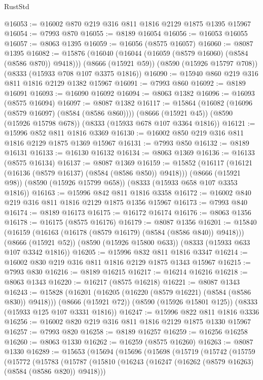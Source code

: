 \begin{lexlean}{RustStd}
\begin{coremodule}
@16053 := @16002 @870 @219 @316 @811 @1816 @2129 @1875 @1395 @15967
@16054 := @7993 @870
@16055 := @8189 @16054
@16056 := @16053 @16055
@16057 := @8063 @1395
@16059 := @16056 (@8575 @16057)
@16060 := @8087 @1395
@16082 := @15876
    (@16040 (@16044 (@16059 (@8579 @16060) (@8584 (@8586 @870)) @9418)))
    (@8666 (@15921 @59))
    (@8590 (@15926 @15797 @708))
    (@8333 (@15933 @708 @107 @3375 @1816))
@16090 := @15940 @860 @219 @316 @811 @1816 @2129 @1382 @15967
@16091 := @7993 @860
@16092 := @8189 @16091
@16093 := @16090 @16092
@16094 := @8063 @1382
@16096 := @16093 (@8575 @16094)
@16097 := @8087 @1382
@16117 := @15864
    (@16082 (@16096 (@8579 @16097) (@8584 (@8586 @860))))
    (@8666 (@15921 @45))
    (@8590 (@15926 @15798 @678))
    (@8333 (@15933 @678 @107 @3364 @1816))
@16121 := @15996 @852 @811 @1816 @3369
@16130 := @16002 @850 @219 @316 @811 @1816 @2129 @1875 @1369 @15967
@16131 := @7993 @850
@16132 := @8189 @16131
@16133 := @16130 @16132
@16134 := @8063 @1369
@16136 := @16133 (@8575 @16134)
@16137 := @8087 @1369
@16159 := @15852
    (@16117 (@16121 (@16136 (@8579 @16137) (@8584 (@8586 @850)) @9418)))
    (@8666 (@15921 @98))
    (@8590 (@15926 @15799 @658))
    (@8333 (@15933 @658 @107 @3353 @1816))
@16163 := @15996 @842 @811 @1816 @3358
@16172 := @16002 @840 @219 @316 @811 @1816 @2129 @1875 @1356 @15967
@16173 := @7993 @840
@16174 := @8189 @16173
@16175 := @16172 @16174
@16176 := @8063 @1356
@16178 := @16175 (@8575 @16176)
@16179 := @8087 @1356
@16201 := @15840
    (@16159 (@16163 (@16178 (@8579 @16179) (@8584 (@8586 @840)) @9418)))
    (@8666 (@15921 @52))
    (@8590 (@15926 @15800 @633))
    (@8333 (@15933 @633 @107 @3342 @1816))
@16205 := @15996 @832 @811 @1816 @3347
@16214 := @16002 @830 @219 @316 @811 @1816 @2129 @1875 @1343 @15967
@16215 := @7993 @830
@16216 := @8189 @16215
@16217 := @16214 @16216
@16218 := @8063 @1343
@16220 := @16217 (@8575 @16218)
@16221 := @8087 @1343
@16243 := @15828
    (@16201 (@16205 (@16220 (@8579 @16221) (@8584 (@8586 @830)) @9418)))
    (@8666 (@15921 @72))
    (@8590 (@15926 @15801 @125))
    (@8333 (@15933 @125 @107 @3331 @1816))
@16247 := @15996 @822 @811 @1816 @3336
@16256 := @16002 @820 @219 @316 @811 @1816 @2129 @1875 @1330 @15967
@16257 := @7993 @820
@16258 := @8189 @16257
@16259 := @16256 @16258
@16260 := @8063 @1330
@16262 := @16259 (@8575 @16260)
@16263 := @8087 @1330
@16289 := @15653
    (@15694
      (@15696
        (@15698
          (@15719
            (@15742
              (@15759
                (@15772
                  (@15783
                    (@15787
                      (@15810
                        (@16243 (@16247 (@16262 (@8579 @16263) (@8584 (@8586 @820)) @9418)))

\end{coremodule}
\end{lexlean}

